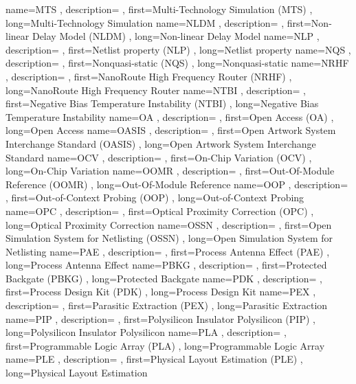 { name={MTS}
, description={}
, first={Multi-Technology Simulation (MTS)}
, long={Multi-Technology Simulation}
}
{ name={NLDM}
, description={}
, first={Non-linear Delay Model (NLDM)}
, long={Non-linear Delay Model}
}
{ name={NLP}
, description={}
, first={Netlist property (NLP)}
, long={Netlist property}
}
{ name={NQS}
, description={}
, first={Nonquasi-static (NQS)}
, long={Nonquasi-static}
}
{ name={NRHF}
, description={}
, first={NanoRoute High Frequency Router (NRHF)}
, long={NanoRoute High Frequency Router}
}
{ name={NTBI}
, description={}
, first={Negative Bias Temperature Instability (NTBI)}
, long={Negative Bias Temperature Instability}
}
{ name={OA}
, description={}
, first={Open Access (OA)}
, long={Open Access}
}
{ name={OASIS}
, description={}
, first={Open Artwork System Interchange Standard (OASIS)}
, long={Open Artwork System Interchange Standard}
}
{ name={OCV}
, description={}
, first={On-Chip Variation (OCV)}
, long={On-Chip Variation}
}
{ name={OOMR}
, description={}
, first={Out-Of-Module Reference (OOMR)}
, long={Out-Of-Module Reference}
}
{ name={OOP}
, description={}
, first={Out-of-Context Probing (OOP)}
, long={Out-of-Context Probing}
}
{ name={OPC}
, description={}
, first={Optical Proximity Correction (OPC)}
, long={Optical Proximity Correction}
}
{ name={OSSN}
, description={}
, first={Open Simulation System for Netlisting (OSSN)}
, long={Open Simulation System for Netlisting}
}
{ name={PAE}
, description={}
, first={Process Antenna Effect (PAE)}
, long={Process Antenna Effect}
}
{ name={PBKG}
, description={}
, first={Protected Backgate (PBKG)}
, long={Protected Backgate}
}
{ name={PDK}
, description={}
, first={Process Design Kit (PDK)}
, long={Process Design Kit}
}
{ name={PEX}
, description={}
, first={Parasitic Extraction (PEX)}
, long={Parasitic Extraction}
}
{ name={PIP}
, description={}
, first={Polysilicon Insulator Polysilicon (PIP)}
, long={Polysilicon Insulator Polysilicon}
}
{ name={PLA}
, description={}
, first={Programmable Logic Array (PLA)}
, long={Programmable Logic Array}
}
{ name={PLE}
, description={}
, first={Physical Layout Estimation (PLE)}
, long={Physical Layout Estimation}
}
